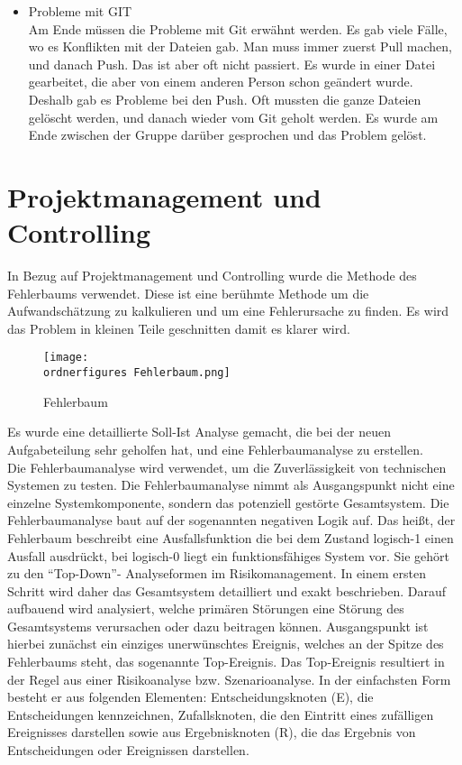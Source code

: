 \begin{itemize}
		\item Probleme mit GIT \\
		
		Am Ende müssen die Probleme mit Git erwähnt werden. Es gab viele Fälle, wo es Konflikten mit der Dateien gab. Man muss immer zuerst Pull machen, und danach Push. Das ist aber oft nicht passiert. Es wurde in einer Datei gearbeitet, die aber von einem anderen Person schon geändert wurde. Deshalb gab es Probleme bei den Push. Oft mussten die ganze Dateien gelöscht werden, und danach wieder vom Git geholt werden. Es wurde am Ende zwischen der Gruppe darüber gesprochen und das Problem gelöst.
	\end{itemize}

	\section{Projektmanagement und Controlling}
	In Bezug auf Projektmanagement und Controlling wurde die Methode des Fehlerbaums verwendet. Diese ist eine ber{\"u}hmte Methode um die Aufwandsch{\"a}tzung zu kalkulieren und um eine Fehlerursache zu finden. Es wird das Problem in kleinen Teile geschnitten damit es klarer wird. 
	\begin{figure}		
		\texttt{[image: \\ordnerfigures Fehlerbaum.png]}
		\caption{Fehlerbaum}
		\label{fig:Fehlerbaum}
	\end{figure}
	Es wurde eine detaillierte Soll-Ist Analyse gemacht, die bei der neuen Aufgabeteilung sehr geholfen hat, und eine Fehlerbaumanalyse zu erstellen.\\
	
	Die Fehlerbaumanalyse wird verwendet, um die Zuverlässigkeit von technischen Systemen zu testen. Die Fehlerbaumanalyse nimmt als Ausgangspunkt nicht eine einzelne Systemkomponente, sondern das potenziell gestörte Gesamtsystem. Die Fehlerbaumanalyse baut auf der sogenannten negativen Logik auf. Das heißt, der Fehlerbaum beschreibt eine Ausfallsfunktion die bei dem Zustand logisch-1 einen Ausfall ausdrückt, bei logisch-0 liegt ein funktionsfähiges System vor.
	Sie gehört zu den ``Top-Down''- Analyseformen im Risikomanagement. In einem ersten Schritt wird daher das Gesamtsystem detailliert und exakt beschrieben. Darauf aufbauend wird analysiert, welche primären Störungen eine Störung des Gesamtsystems verursachen oder dazu beitragen können. Ausgangspunkt ist hierbei zunächst ein einziges unerwünschtes Ereignis, welches an der Spitze des Fehlerbaums steht, das sogenannte Top-Ereignis. Das Top-Ereignis resultiert in der Regel aus einer Risikoanalyse bzw. Szenarioanalyse.
	In der einfachsten Form besteht er aus folgenden Elementen: Entscheidungsknoten (E), die Entscheidungen kennzeichnen, Zufallsknoten, die den Eintritt eines zufälligen Ereignisses darstellen sowie aus Ergebnisknoten (R), die das Ergebnis von Entscheidungen oder Ereignissen darstellen.
	
